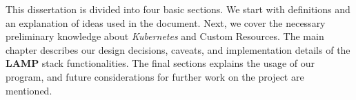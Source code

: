 This dissertation is divided into four basic sections. We start with definitions and an explanation of ideas used in the document. Next, we cover the necessary preliminary knowledge about \textit{Kubernetes} and Custom Resources. The main chapter describes our design decisions, caveats, and implementation details of the \textbf{LAMP} stack functionalities. The final sections explains the usage of our program, and future considerations for further work on the project are mentioned.